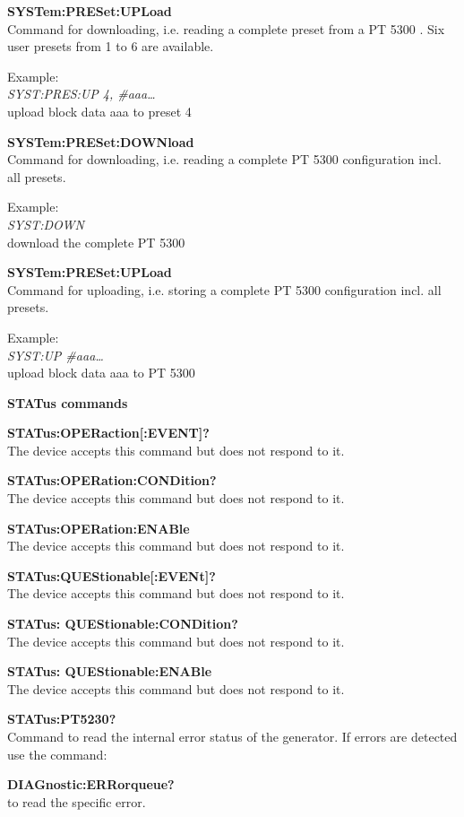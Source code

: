 \textbf{SYSTem:PRESet:UPLoad}\\
Command for downloading, i.e. reading a complete preset from a PT 5300 . Six user presets from 1 to 6 are available.

Example:\\
\textit{SYST:PRES:UP 4, \#aaa\ldots}\\
upload block data aaa to preset 4

\textbf{SYSTem:PRESet:DOWNload}\\
Command for downloading, i.e. reading a complete PT 5300 configuration incl. all presets.

Example:\\
\textit{SYST:DOWN}\\
download the complete PT 5300

\textbf{SYSTem:PRESet:UPLoad}\\
Command for uploading, i.e. storing a complete PT 5300 configuration incl. all presets.

Example:\\
\textit{SYST:UP \#aaa\ldots}\\
upload block data aaa to PT 5300

\textbf{STATus commands}

\textbf{STATus:OPERaction[:EVENT]?}\\
The device accepts this command but does not respond to it.

\textbf{STATus:OPERation:CONDition?}\\
The device accepts this command but does not respond to it.

\textbf{STATus:OPERation:ENABle}\\
The device accepts this command but does not respond to it.

\textbf{STATus:QUEStionable[:EVENt]?}\\
The device accepts this command but does not respond to it.

\textbf{STATus: QUEStionable:CONDition?}\\
The device accepts this command but does not respond to it.

\textbf{STATus: QUEStionable:ENABle}\\
The device accepts this command but does not respond to it.

\textbf{STATus:PT5230?}\\
Command to read the internal error status of the generator. If errors are detected use the command:

\textbf{DIAGnostic:ERRorqueue?}\\
to read the specific error. 

